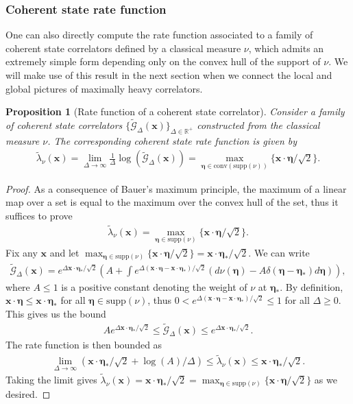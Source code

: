 \documentclass[a4paper,11pt]{article}
\theoremstyle{plain}
\newtheorem{prop}[thm]{Proposition}
\theoremstyle{definition}
\theoremstyle{remark}
\newcommand{\bs}[1]{\boldsymbol{#1}}
\newcommand{\ba}{\begin{equation} \begin{aligned}}
\newcommand{\ea}{\end{aligned} \end{equation}}
\newcommand{\De}{\Delta}
\begin{document}
\subsubsection{Coherent state rate function}

One can also directly compute the rate function associated to a family of coherent state correlators defined by a classical measure $\nu$, which admits an extremely simple form depending only on the convex hull of the support of $\nu$. We will make use of this result in the next section when we connect the local and global pictures of maximally heavy correlators. 

\begin{prop}[Rate function of a coherent state correlator]
\label{ratefunctioncompute}
Consider a family of coherent state correlators $\{\tilde{\mathcal{G}}_\De(\bs{x})\}_{\De \in \mathbb{R}^+}$ constructed from the classical measure $\nu$. The corresponding coherent state rate function is given by
\ba
    \tilde{\lambda}_{\nu}(\bs{x}) = \lim_{\De\to\infty} \frac{1}{\De} \log\left(\tilde{\mathcal{G}}_\De(\bs{x})\right) = \max_{\bs{\eta} \in \mathrm{conv}(\mathrm{supp}(\nu))} \{ \bs{x} \cdot \bs{\eta}/\sqrt{2}\}.
\ea
\end{prop}
\begin{proof}
As a consequence of Bauer's maximum principle, the maximum of a linear map over a set is equal to the maximum over the convex hull of the set, thus it suffices to prove
\ba
\tilde{\lambda}_{\nu}(\bs{x}) = \max_{\bs{\eta} \in \mathrm{supp}(\nu)} \{ \bs{x} \cdot \bs{\eta}/\sqrt{2}\}.
\ea
Fix any $\bs{x}$ and let $\max_{\bs{\eta} \in \mathrm{supp}(\nu)}\{ \bs{x}\cdot \bs{\eta}/\sqrt{2} \} = \bs{x} \cdot \bs{\eta}_* /\sqrt{2}$. We can write
\ba
\tilde{\mathcal{G}}_\De(\bs{x}) = e^{\De \bs{x} \cdot \bs{\eta}_* /\sqrt{2} } \left( A + \int  e^{\De ( \bs{x}\cdot \bs{\eta} - \bs{x} \cdot \bs{\eta}_*)/\sqrt{2}} (d\nu(\bs{\eta})- A \delta(\bs{\eta} - \bs{\eta}_*)d\bs{\eta})\right),
\ea
where $A\leq1$ is a positive constant denoting the weight of $\nu$ at $\bs{\eta}_*$. By definition, $\bs{x} \cdot \bs{\eta} \leq \bs{x}\cdot\bs{\eta}_*$ for all $\bs{\eta} \in \mathrm{supp}(\nu)$, thus $0<e^{\De ( \bs{x}\cdot \bs{\eta} - \bs{x} \cdot \bs{\eta}_*)/\sqrt{2}} \leq 1$ for all $\De\geq0$. This gives us the bound
\ba
A e^{\De \bs{x} \cdot \bs{\eta}_* /\sqrt{2} }  \leq \tilde{\mathcal{G}}_\De(\bs{x}) \leq e^{\De \bs{x} \cdot \bs{\eta}_* /\sqrt{2} }.
\ea
The rate function is then bounded as
\ba
\lim_{\De \to \infty} \left( \bs{x}\cdot\bs{\eta}_*/\sqrt{2} + \log(A)/\De\right) \leq \tilde{\lambda}_{\nu}(\bs{x}) \leq \bs{x}\cdot\bs{\eta}_*/\sqrt{2}.
\ea
Taking the limit gives $\tilde{\lambda}_{\nu}(\bs{x}) = \bs{x}\cdot \bs{\eta}_*/\sqrt{2} = \max_{\bs{\eta} \in \mathrm{supp}(\nu)}\{ \bs{x} \cdot \bs{\eta}/\sqrt{2}\}$ as we desired.
\end{proof}
\end{document}
